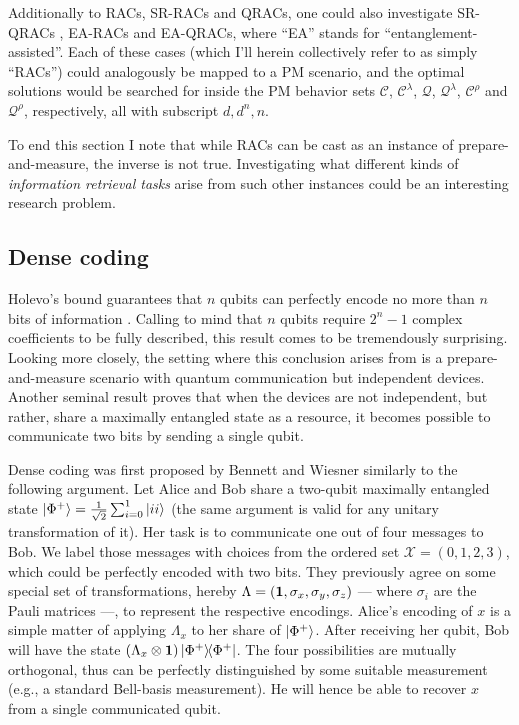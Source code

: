             Additionally to RACs, SR-RACs and QRACs, one could also investigate SR-QRACs \cite{ambainis_srqracs_2009}, EA-RACs \cite{pawlowski_earacs_2010} and EA-QRACs, where ``EA'' stands for ``entanglement-assisted''. Each of these cases (which I'll herein collectively refer to as simply ``RACs'') could analogously be mapped to a PM scenario, and the optimal solutions would be searched for inside the PM behavior sets $\mathcal{C}$, $\mathcal{C}^\lambda$, $\mathcal{Q}$, $\mathcal{Q}^\lambda$, $\mathcal{C}^\rho$ and $\mathcal{Q}^\rho$, respectively, all with subscript $d,d^n,n$.

            To end this section I note that while RACs can be cast as an instance of prepare-and-measure, the inverse is not true. Investigating what different kinds of \emph{information retrieval tasks} \cite{emeriau_torpedo_2020} arise from such other instances could be an interesting research problem.

        \subsection{Dense coding}
        \label{sec:dense-coding}

            Holevo's bound guarantees that $n$ qubits can perfectly encode no more than $n$ bits of information \cite{holevo-bound-1973}. Calling to mind that $n$ qubits require $2^n - 1$ complex coefficients to be fully described, this result comes to be tremendously surprising. Looking more closely, the setting where this conclusion arises from is a prepare-and-measure scenario with quantum communication but independent devices. Another seminal result proves that when the devices are not independent, but rather, share a maximally entangled state as a resource, it becomes possible to communicate two bits by sending a single qubit.

            Dense coding was first proposed by Bennett and Wiesner \cite{bennett_1992_superdense} similarly to the following argument. Let Alice and Bob share a two-qubit maximally entangled state $\ket{\Phi^+} = \frac{1}{\sqrt{2}} \sum_{i = 0}^{1} \ket{ii}$ (the same argument is valid for any unitary transformation of it). Her task is to communicate one out of four messages to Bob. We label those messages with choices from the ordered set $\mathcal{X} = (0, 1, 2, 3)$, which could be perfectly encoded with two bits. They previously agree on some special set of transformations, hereby $\Lambda = (\mathbf{1},\sigma_x, \sigma_y, \sigma_z)$ --- where $\sigma_i$ are the Pauli matrices ---, to represent the respective encodings. Alice's encoding of $x$ is a simple matter of applying $\Lambda_x$ to her share of $\ket{\Phi^+}$. After receiving her qubit, Bob will have the state $\left( \Lambda_x \otimes \mathbf{1} \right) \ketbra{\Phi^+}{\Phi^+}$. The four possibilities are mutually orthogonal, thus can be perfectly distinguished by some suitable measurement (e.g., a standard Bell-basis measurement). He will hence be able to recover $x$ from a single communicated qubit.
            
